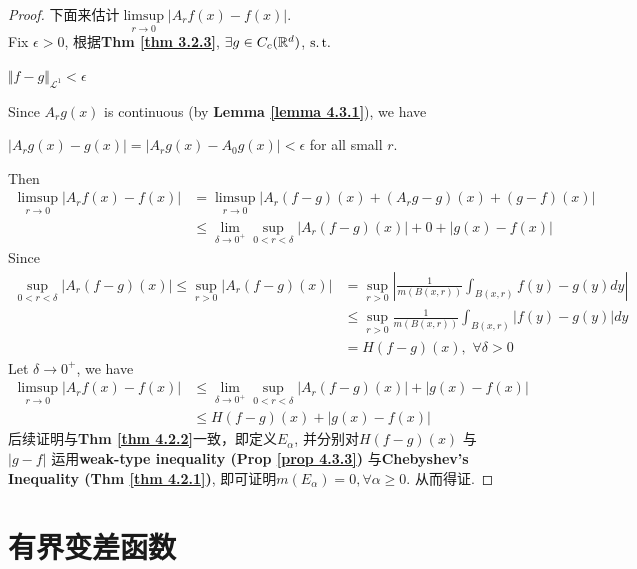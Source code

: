 \begin{thm}
\begin{proof}
			下面来估计$\underset{r \to 0}{\limsup}{\left| A_{r}f(x) - f(x) \right|}$. \\
			Fix $\epsilon > 0$, 根据\textbf{Thm \ref{thm 3.2.3}}, $\exists g \in C_{c}(\mathbb{R}^d)$, $\operatorname{s.t.}$
			\begin{center}
				$\Vert f - g \Vert_{\mathcal{L}^1} < \epsilon$
			\end{center}
			Since $A_{r}g(x)$ is continuous (by \textbf{Lemma \ref{lemma 4.3.1}}),  we have
			\begin{center}
				$\left| A_{r}g(x) - g(x) \right| = \left| A_{r}g(x) - A_{0}g(x) \right| < \epsilon$ for all small $r$.
			\end{center}
			Then
			\begin{align}
				\limsup_{r \to 0}{\left| A_{r}f(x) - f(x) \right|}
				&= \limsup_{r \to 0}{\left| A_{r}(f - g)(x) + (A_{r}g - g)(x) + (g - f)(x) \right|} \\
				&\leq \lim_{\delta \to 0^{+}}{\sup_{0 < r < \delta}{\left| A_{r}(f - g)(x) \right|}} + 0 + \left| g(x) - f(x) \right|
			\end{align}
			Since 
			\begin{align}
				\sup_{0 < r < \delta}{\left| A_{r}(f - g)(x) \right|} 
				\leq \sup_{r > 0}{\left| A_{r}(f - g)(x) \right|}
				&= \sup_{r > 0}{\left| \frac{1}{m(B(x , r))} \int_{B(x , r)}{f(y) - g(y) dy} \right|} \\
				&\leq \sup_{r > 0}{\frac{1}{m(B(x , r))} \int_{B(x , r)}{\left| f(y) - g(y) \right| dy}} \\
				&= H(f - g)(x) , \,\, \forall \delta > 0
			\end{align}
			Let $\delta \to 0^{+}$, we have
			\begin{align}
				\limsup_{r \to 0}{\left| A_{r}f(x) - f(x) \right|}
				&\leq \lim_{\delta \to 0^{+}}{\sup_{0 < r < \delta}{\left| A_{r}(f - g)(x) \right|}} + \left| g(x) - f(x) \right| \\
				&\leq H(f - g)(x) + \left| g(x) - f(x) \right|
			\end{align}
			后续证明与\textbf{Thm \ref{thm 4.2.2}}一致，即定义$E_\alpha$, 并分别对$H(f - g)(x)$ 与$\left| g - f \right|$ 运用\textbf{weak-type inequality (Prop \ref{prop 4.3.3})} 与\textbf{Chebyshev's Inequality (Thm \ref{thm 4.2.1})}, 即可证明$m(E_\alpha) = 0 , \forall \alpha \geq 0$. 从而得证.
		\end{proof}
	\end{thm}

\newpage
\section{有界变差函数}
